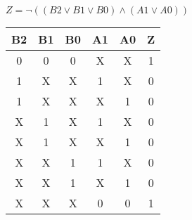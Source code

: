 
\begin{center}
    {\(Z = \lnot ((B2 \lor B1 \lor B0) \land (A1 \lor A0)) \)}
    \begin{table}[h] %
        \begin{center}
            \begin{tabular}{|c|c|c|c|c||c|} \hline
            B2 & B1 & B0 & A1 & A0 & Z \\ \hline\hline
            0  & 0  & 0  & X  & X  & 1\\ \hline
            1  & X  & X  & 1  & X  & 0\\ \hline
            1  & X  & X  & X  & 1  & 0\\ \hline
            X  & 1  & X  & 1  & X  & 0\\ \hline
            X  & 1  & X  & X  & 1  & 0\\ \hline
            X  & X  & 1  & 1  & X  & 0\\ \hline
            X  & X  & 1  & X  & 1  & 0\\ \hline
            X  & X  & X  & 0  & 0  & 1\\ \hline
            \end{tabular}
        \end{center}
    \end{table}
\end{center}
